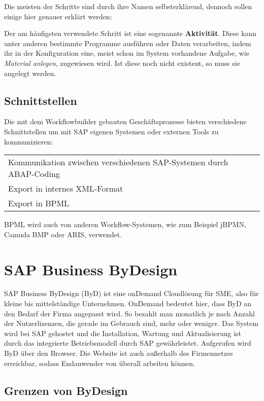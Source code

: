 \documentclass{handout}
\begin{document}
Die meisten der Schritte sind durch ihre Namen selbsterklärend, dennoch sollen einige hier genauer erklärt werden:

Der am häufigsten verwendete Schritt ist eine sogenannte \textbf{Aktivität}. Diese kann unter anderen bestimmte Programme ausführen oder Daten verarbeiten, indem ihr in der Konfiguration eine, meist schon im System vorhandene Aufgabe, wie \textit{Material anlegen}, zugewiesen wird. Ist diese noch nicht existent, so muss sie angelegt werden.

\subsection{Schnittstellen}

Die mit dem Workflowbuilder gebauten Geschäftsprozesse bieten verschiedene Schnittstellen um mit SAP eigenen Systemen oder externen Tools zu kommunizieren:

\small
\begin{tabular}{L l}
Kommunikation zwischen verschiedenen SAP-Systemen durch ABAP-Coding\\
Export in internes XML-Format\\
Export in BPML\\
\end{tabular}
\normalsize

BPML wird auch von anderen Workflow-Systemen, wie zum Beispiel jBPMN, Camuda BMP oder ARIS, verwendet.

\section{SAP Business ByDesign}

SAP Business ByDesign (ByD) ist eine onDemand Cloudlösung für SME, also für kleine bis mittelständige Unternehmen. OnDemand bedeutet hier, dass ByD an den Bedarf der Firma angepasst wird. So bezahlt man monatlich je nach Anzahl der Nutzerlizenzen, die gerade im Gebrauch sind, mehr oder weniger. Das System wird bei SAP gehostet und die Installation, Wartung und Aktualisierung ist durch das integrierte Betriebsmodell durch SAP gewährleistet. Aufgerufen wird ByD über den Browser. Die Website ist auch außerhalb des Firmennetzes erreichbar, sodass Endanwender von überall arbeiten können.

\subsection{Grenzen von ByDesign}
\end{document}
